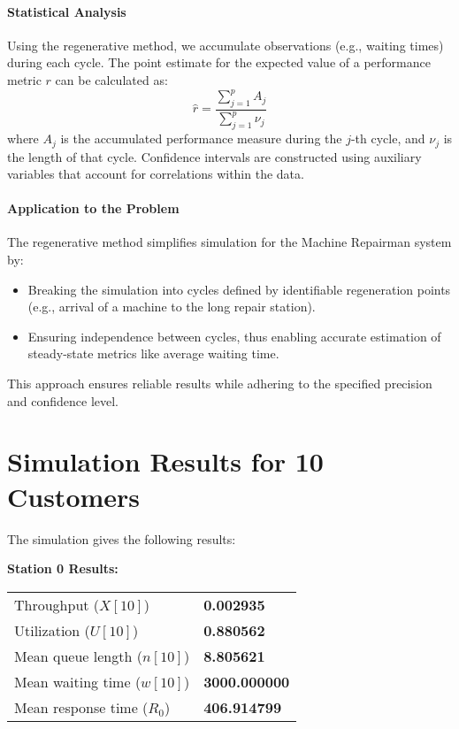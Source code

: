 \documentclass[12pt]{article}
\begin{document}
	\paragraph{Statistical Analysis}
	Using the regenerative method, we accumulate observations (e.g., waiting times) during each cycle. The point estimate for the expected value of a performance metric $r$ can be calculated as:
	\[
	\hat{r} = \frac{\sum_{j=1}^p A_j}{\sum_{j=1}^p \nu_j}
	\]
	where $A_j$ is the accumulated performance measure during the $j$-th cycle, and $\nu_j$ is the length of that cycle. Confidence intervals are constructed using auxiliary variables that account for correlations within the data.
	
	\paragraph{Application to the Problem}
	The regenerative method simplifies simulation for the Machine Repairman system by:
	\begin{itemize}
		\item Breaking the simulation into cycles defined by identifiable regeneration points (e.g., arrival of a machine to the long repair station).
		\item Ensuring independence between cycles, thus enabling accurate estimation of steady-state metrics like average waiting time.
	\end{itemize}
	
	This approach ensures reliable results while adhering to the specified precision and confidence level.
	\newpage
	\section*{Simulation Results for 10 Customers}
	The simulation gives the following results:
	
	\noindent\textbf{Station 0 Results:}
	\begin{table}[h!]
		\centering
		\begin{tabular}{@{}l l@{}}
			\toprule
			Throughput ($X[10]$)              & \textbf{0.002935} \\
			Utilization ($U[10]$)             & \textbf{0.880562} \\
			Mean queue length ($n[10]$)       & \textbf{8.805621} \\
			Mean waiting time ($w[10]$)       & \textbf{3000.000000} \\
			Mean response time ($R_0$)        & \textbf{406.914799} \\
			\bottomrule
		\end{tabular}
	\end{table}
	
\end{document}
